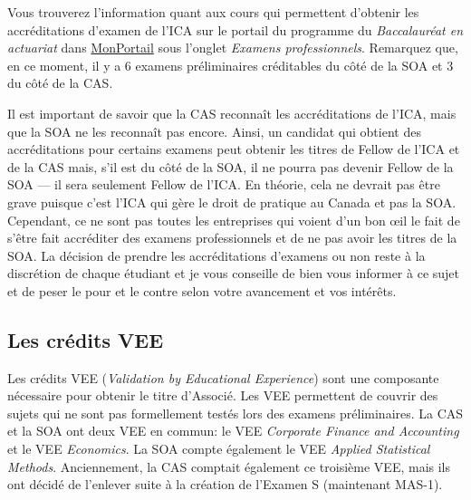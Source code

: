 Vous trouverez l'information quant aux cours qui permettent d'obtenir les accréditations d'examen de l'ICA sur le portail du programme du \textit{Baccalauréat en actuariat} dans \href{https://www.monportail.ulaval.ca}{MonPortail} sous l'onglet \textit{Examens professionnels}. Remarquez que, en ce moment, il y a 6 examens préliminaires créditables du côté de la SOA et 3 du côté de la CAS. \vspace{\baselineskip}

Il est important de savoir que la CAS reconnaît les accréditations de l'ICA, mais que la SOA ne les reconnaît pas encore. Ainsi, un candidat qui obtient des accréditations pour certains examens peut obtenir les titres de Fellow de l'ICA et de la CAS mais, s'il est du côté de la SOA, il ne pourra pas devenir Fellow de la SOA --- il sera seulement Fellow de l'ICA. En théorie, cela ne devrait pas être grave puisque c'est l'ICA qui gère le droit de pratique au Canada et pas la SOA. Cependant, ce ne sont pas toutes les entreprises qui voient d'un bon œil le fait de s'être fait accréditer des examens professionnels et de ne pas avoir les titres de la SOA. La décision de prendre les accréditations d'examens ou non reste à la discrétion de chaque étudiant et je vous conseille de bien vous informer à ce sujet et de peser le pour et le contre selon votre avancement et vos intérêts.

\newpage

\subsection*{Les crédits VEE}
\label{subsec:vee}
Les crédits VEE (\emph{Validation by Educational Experience}) sont une composante nécessaire pour obtenir le titre d'Associé. Les VEE permettent de couvrir des sujets qui ne sont pas formellement testés lors des examens préliminaires. La CAS et la SOA ont deux VEE en commun: le VEE \emph{Corporate Finance and Accounting} et le VEE \emph{Economics}. La SOA compte également le VEE \emph{Applied Statistical Methods}. Anciennement, la CAS comptait également ce troisième VEE, mais ils ont décidé de l'enlever suite à la création de l'Examen S (maintenant MAS-1).\vspace{\baselineskip}

